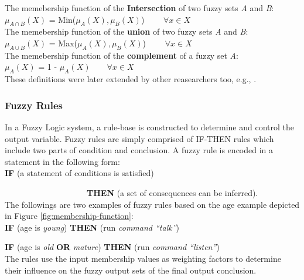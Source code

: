 \documentclass[11pt]{article}
\begin{document}
\noindent The memebership function of the \textbf{Intersection} of two fuzzy
sets \textit{A} and \textit{B}:\\

$\mu_{A \cap B}(X)$ = Min($\mu_{A}(X), \mu_{B}(X)$) $\qquad \forall x \in X$\\

\noindent The memebership function of the \textbf{union} of two fuzzy sets
\textit{A} and \textit{B}:\\

$\mu_{A \cup B}(X)$ = Max($\mu_{A}(X), \mu_{B}(X)$) $\qquad \forall x \in X$\\

\noindent The memebership function of the \textbf{complement} of a fuzzy set
\textit{A}:\\

$\mu_{A}(X)$ = 1 - $\mu_{A}(X) \qquad \forall x \in X$\\

\noindent These definitions were later extended by other reasearchers too, e.g.,
\cite{yager:generalizing-leximin}.

\subsubsection{Fuzzy Rules}
\label{sec:fuzzy-rules}

In a Fuzzy Logic system, a rule-base is constructed to determine and control the
output variable. Fuzzy rules are simply comprised of IF-THEN rules which include
two parts of condition and conclusion. A fuzzy rule is encoded in a statement in
the following form:\\

\noindent \textbf{IF} (a statement of conditions is satisfied)

$\qquad\qquad\qquad\qquad\qquad$\textbf{THEN} (a set of consequences can
be inferred).\\

The followings are two examples of fuzzy
rules based on the age example depicted in Figure
\ref{fig:membership-function}:\\

\textbf{IF} (age is \textit{young}) \textbf{THEN} (run \textit{command
``talk''})
 
\textbf{IF} (age is \textit{old} \textbf{OR} \textit{mature}) \textbf{THEN} (run
\textit{command ``listen''})\\

\noindent The rules use the input membership values as weighting factors to
determine their influence on the fuzzy output sets of the final output
conclusion.
\end{document}
